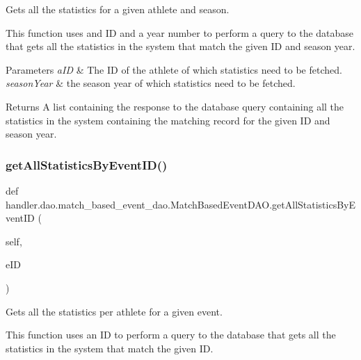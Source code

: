 Gets all the statistics for a given athlete and season. 

This function uses and ID and a year number to perform a query to the database that gets all the statistics in the system that match the given ID and season year.


\begin{DoxyParams}{Parameters}
{\em a\+ID} & The ID of the athlete of which statistics need to be fetched. \\
\hline
{\em season\+Year} & the season year of which statistics need to be fetched.\\
\hline
\end{DoxyParams}
\begin{DoxyReturn}{Returns}
A list containing the response to the database query containing all the statistics in the system containing the matching record for the given ID and season year. 
\end{DoxyReturn}
\mbox{\label{classhandler_1_1dao_1_1match__based__event__dao_1_1_match_based_event_d_a_o_a04d43f14b2e7d75890f5733d4cd3f936}} 
\subsubsection{\texorpdfstring{get\+All\+Statistics\+By\+Event\+I\+D()}{getAllStatisticsByEventID()}}
{\footnotesize\ttfamily def handler.\+dao.\+match\+\_\+based\+\_\+event\+\_\+dao.\+Match\+Based\+Event\+D\+A\+O.\+get\+All\+Statistics\+By\+Event\+ID (\begin{DoxyParamCaption}\item[{}]{self,  }\item[{}]{e\+ID }\end{DoxyParamCaption})}



Gets all the statistics per athlete for a given event. 

This function uses an ID to perform a query to the database that gets all the statistics in the system that match the given ID.


